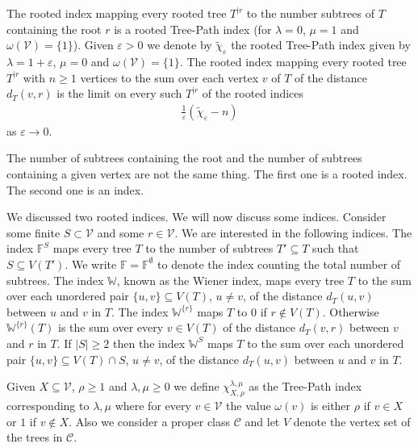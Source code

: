 \documentclass[11 pt]{modarticle}
\newcommand{\vset}{\mathcal{V}}
\newcommand{\wmap}{\omega}
\newcommand{\size}[1]{|#1|}
\newcommand{\distance}[3]{d_{#3}(#1,#2)}
\newcommand{\rtree}[2]{{#1}^{\lvert #2}}
\newcommand{\tclass}{\mathcal{C}}
\begin{document}
The rooted index mapping every rooted tree $\rtree{T}{r}$ to the number subtrees of $T$ containing the root $r$ is a rooted Tree-Path index (for $\lambda = 0$, $\mu = 1$ and $\wmap(\vset) = \{1\}$). Given $\varepsilon > 0$ we denote by $\widetilde{\chi}_{\varepsilon}$ the rooted Tree-Path index given by $\lambda = 1 + \varepsilon$, $\mu = 0$ and $\wmap(\vset) = \{1\}$. The rooted index mapping every rooted tree $\rtree{T}{r}$ with $n \geq 1$ vertices to the sum over each vertex $v$ of $T$ of the distance $\distance{v}{r}{T}$ is the limit on every such $\rtree{T}{r}$ of the rooted indices
\begin{eqnarray*}
	\frac{1}{\varepsilon}(\widetilde{\chi}_{\varepsilon} - n)
\end{eqnarray*}
as $\varepsilon \rightarrow 0$.

\begin{rem}
The number of subtrees containing the root and the number of subtrees containing a given vertex are not the same thing. The first one is a rooted index. The second one is an index.
\end{rem}

We discussed two rooted indices. We will now discuss some indices. Consider some finite $S \subset \vset$ and some $r \in \vset$. We are interested in the following indices. The index $\mathbb{F}^S$ maps every tree $T$ to the number of subtrees $T' \subseteq T$ such that $S \subseteq V(T')$. We write $\mathbb{F} = \mathbb{F}^{\emptyset}$ to denote the index counting the total number of subtrees. The index $\mathbb{W}$, known as the Wiener index, maps every tree $T$ to the sum over each unordered pair $\{u,v\} \subseteq V(T)$, $u \neq v$, of the distance $\distance{u}{v}{T}$ between $u$ and $v$ in $T$. The index $\mathbb{W}^{\{r\}}$ maps $T$ to $0$ if $r \notin V(T)$. Otherwise $\mathbb{W}^{\{r\}}(T)$ is the sum over every $v \in V(T)$ of the distance $\distance{v}{r}{T}$ between $v$ and $r$ in $T$. If $\size{S} \geq 2$ then the index $\mathbb{W}^S$ maps $T$ to the sum over each unordered pair $\{u, v\} \subseteq V(T) \cap S$, $u \neq v$, of the distance $\distance{u}{v}{T}$ between $u$ and $v$ in $T$.

Given $X \subseteq \vset$, $\rho \geq 1$ and $\lambda, \mu \geq 0$ we define $\chi^{\lambda, \mu}_{X, \rho}$ as the Tree-Path index corresponding to $\lambda, \mu$ where for every $v \in \vset$ the value $\wmap(v)$ is either $\rho$ if $v \in X$ or $1$ if $v \notin X$. Also we consider a proper class $\tclass$ and let $V$ denote the vertex set of the trees in $\tclass$.
\end{document}
